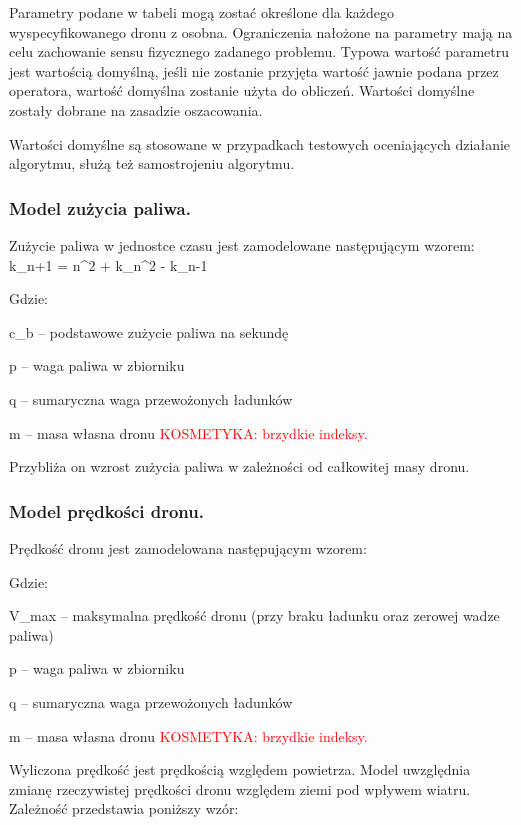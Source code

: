\documentclass[twoside, 12pt]{article}
\begin{document}
\par Parametry podane w tabeli mogą zostać określone dla każdego wyspecyfikowanego dronu z osobna. Ograniczenia nałożone na parametry mają na celu zachowanie sensu fizycznego zadanego problemu. Typowa wartość parametru jest wartością domyślną, jeśli nie zostanie przyjęta wartość jawnie podana przez operatora, wartość domyślna zostanie użyta do obliczeń. Wartości domyślne zostały dobrane na zasadzie oszacowania.
\par Wartości domyślne są stosowane w przypadkach testowych oceniających działanie algorytmu, służą też samostrojeniu algorytmu.



\subsubsection{Model zużycia paliwa.}
\par Zużycie paliwa w jednostce czasu jest zamodelowane następującym wzorem:
k_{n+1} = n^2 + k_n^2 - k_{n-1}
\par Gdzie:
\par c_b – podstawowe zużycie paliwa na sekundę
\par p – waga paliwa w zbiorniku
\par q – sumaryczna waga przewożonych ładunków
\par m – masa własna dronu
\textcolor{red}{KOSMETYKA: brzydkie indeksy.}
\par Przybliża on wzrost zużycia paliwa w zależności od całkowitej masy dronu. 



\subsubsection{Model prędkości dronu.}
\par Prędkość dronu jest zamodelowana następującym wzorem:

\par Gdzie:
\par V_max – maksymalna prędkość dronu (przy braku ładunku oraz zerowej wadze paliwa)
\par p – waga paliwa w zbiorniku
\par q – sumaryczna waga przewożonych ładunków
\par m – masa własna dronu
\textcolor{red}{KOSMETYKA: brzydkie indeksy.}
\par Wyliczona prędkość jest prędkością względem powietrza. Model uwzględnia zmianę rzeczywistej prędkości dronu względem ziemi pod wpływem wiatru. Zależność przedstawia poniższy wzór:
\end{document}
